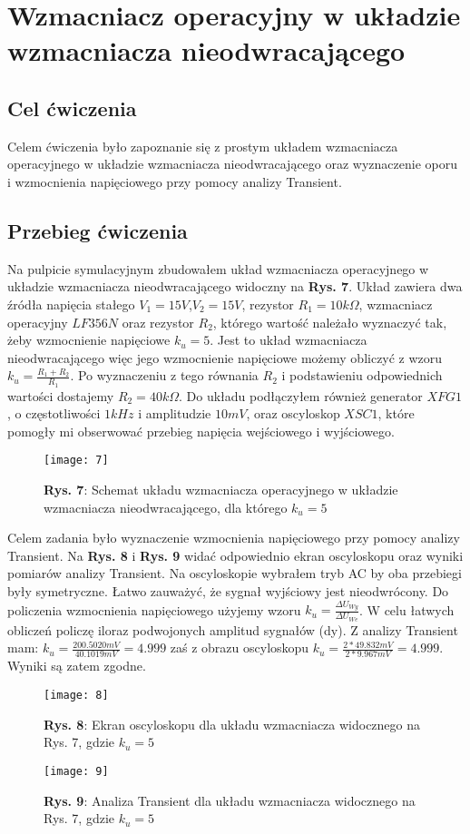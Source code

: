 \documentclass[11pt]{article}
\begin{document}
\section{Wzmacniacz operacyjny w układzie wzmacniacza nieodwracającego}
\subsection{Cel ćwiczenia}
Celem ćwiczenia było zapoznanie się z prostym układem wzmacniacza operacyjnego w układzie wzmacniacza nieodwracającego oraz wyznaczenie oporu i wzmocnienia napięciowego przy pomocy analizy Transient.
\subsection{Przebieg ćwiczenia}
Na pulpicie symulacyjnym zbudowałem układ wzmacniacza operacyjnego w układzie wzmacniacza nieodwracającego widoczny na \textbf{Rys. 7}. Układ zawiera dwa źródła napięcia stałego $V_1=15V$,$V_2=15V$, rezystor $R_1=10k\Omega$, wzmacniacz operacyjny $LF356N$ oraz rezystor $R_2$, którego wartość 
należało wyznaczyć tak, żeby wzmocnienie napięciowe $k_u=5$. Jest to układ wzmacniacza nieodwracającego więc jego wzmocnienie napięciowe możemy obliczyć z wzoru $k_u=\frac{R_1+R_2}{R_1}$. Po wyznaczeniu z tego równania $R_2$ i podstawieniu odpowiednich wartości dostajemy $R_2=40k\Omega$.
Do układu podłączyłem również generator $XFG1$, o częstotliwości $1kHz$ i amplitudzie $10mV$, oraz oscyloskop $XSC1$, które pomogły mi obserwować przebieg napięcia wejściowego i wyjściowego.
\begin{figure}[H]
\centering
\texttt{[image: 7]}
\caption*{\textbf{Rys. 7}: Schemat układu wzmacniacza operacyjnego w układzie wzmacniacza nieodwracającego, dla którego $k_u=5$}
\end{figure}
\noindent Celem zadania było wyznaczenie wzmocnienia napięciowego przy pomocy analizy Transient. Na \textbf{Rys. 8} i \textbf{Rys. 9} widać odpowiednio ekran oscyloskopu oraz wyniki pomiarów analizy Transient. Na oscyloskopie wybrałem tryb AC by oba przebiegi były symetryczne. Łatwo zauważyć, że sygnał wyjściowy
jest nieodwrócony. Do policzenia wzmocnienia napięciowego
użyjemy wzoru $k_u=\frac{{\Delta}U_{Wy}}{{\Delta}U_{We}}$. W celu łatwych obliczeń policzę iloraz podwojonych amplitud sygnałów (dy). Z analizy Transient mam: $k_u=\frac{200.5020mV}{40.1019mV}=4.999$ zaś z obrazu oscyloskopu $k_u=\frac{2*49.832mV}{2*9.967mV}=4.999$. Wyniki są zatem zgodne.
\begin{figure}[H]
\centering
\texttt{[image: 8]}
\caption*{\textbf{Rys. 8}: Ekran oscyloskopu dla układu wzmacniacza widocznego na Rys. 7, gdzie $k_u=5$}
\end{figure}
\begin{figure}[H]
\centering
\texttt{[image: 9]}
\caption*{\textbf{Rys. 9}: Analiza Transient dla układu wzmacniacza widocznego na Rys. 7, gdzie $k_u=5$ }
\end{figure}
\end{document}
